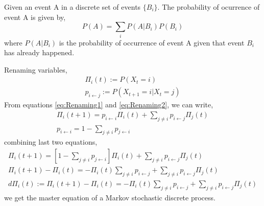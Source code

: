 \begin{theorem}
Given an event A in a discrete set of events $\{B_{i}\}$. The probability of ocurrence of event A is given by,
\begin{equation}
    P\left(A\right) = \sum_{i}P\left(A|B_{i}\right)P\left(B_{i}\right)
\end{equation}
where $P\left(A|B_{i}\right)$ is the probability of occurrence of event A given that event $B_{i}$ has already happened. 
\end{theorem}
Renaming variables,
\begin{align}
    \label{eq:Renaming1}
    \Pi_{i}(t) := P\left(X_{t} = i\right) \\
    \label{eq:Renaming2}
    p_{i \leftarrow j} := P\left(X_{t+1} = i | X_{t}=j\right)
\end{align}
From equations \ref{eq:Renaming1} and \ref{eq:Renaming2}, we can write,
\begin{align}
        \Pi_{i}(t+1) = p_{i \leftarrow i}\Pi_{i}(t) + \sum_{j \neq i} p_{i \leftarrow j}\Pi_{j}(t) \\ 
        p_{i \leftarrow i} = 1 - \sum_{j\neq i}p_{j \leftarrow i}
\end{align}
combining last two equations,
\begin{align}
    \Pi_{i}(t+1) = \left[1 - \sum_{j\neq i}p_{j \leftarrow i}\right]\Pi_{i}(t) + \sum_{j\neq i}p_{i \leftarrow j}\Pi_{j}(t)\\
    \Pi_{i}(t+1) - \Pi_{i}(t) = -\Pi_{i}(t) \sum_{j \neq i}p_{i \leftarrow j} + \sum_{j \neq i} p_{i \leftarrow j}\Pi_{j}(t) \\
    \label{eq: MasterEquationDiscrete}
    d\Pi_{i}(t) := \Pi_{i}(t+1) - \Pi_{i}(t) =  -\Pi_{i}(t) \sum_{j \neq i}p_{i \leftarrow j} + \sum_{j \neq i} p_{i \leftarrow j}\Pi_{j}(t)
\end{align}
we get the master equation of a Markov stochastic discrete process.
